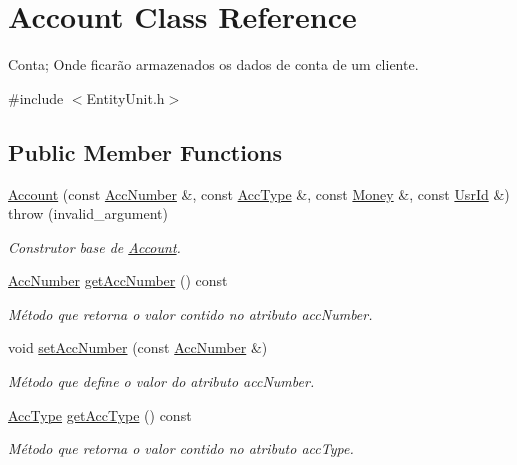 \hypertarget{classAccount}{\section{Account Class Reference}
\label{d7/d10/classAccount}
}


Conta; Onde ficarão armazenados os dados de conta de um cliente.  




{\ttfamily \#include $<$Entity\-Unit.\-h$>$}

\subsection*{Public Member Functions}
\begin{DoxyCompactItemize}
\item 
\hyperlink{classAccount_a26dcd22e552626c14728150a671608a1}{Account} (const \hyperlink{classAccNumber}{Acc\-Number} \&, const \hyperlink{classUsrType}{Acc\-Type} \&, const \hyperlink{classMoney}{Money} \&, const \hyperlink{classUsrId}{Usr\-Id} \&)  throw (invalid\-\_\-argument)
\begin{DoxyCompactList}\small\item\em Construtor base de \hyperlink{classAccount}{Account}. \end{DoxyCompactList}\item 
\hyperlink{classAccNumber}{Acc\-Number} \hyperlink{classAccount_a74f26f24e13e66a055bb8441dfb3d881}{get\-Acc\-Number} () const 
\begin{DoxyCompactList}\small\item\em Método que retorna o valor contido no atributo acc\-Number. \end{DoxyCompactList}\item 
void \hyperlink{classAccount_a3e669090168f13d2a8269af456546a1e}{set\-Acc\-Number} (const \hyperlink{classAccNumber}{Acc\-Number} \&)
\begin{DoxyCompactList}\small\item\em Método que define o valor do atributo acc\-Number. \end{DoxyCompactList}\item 
\hyperlink{classUsrType}{Acc\-Type} \hyperlink{classAccount_a34e1f7e507d7abdf575e4833d6f8d36b}{get\-Acc\-Type} () const 
\begin{DoxyCompactList}\small\item\em Método que retorna o valor contido no atributo acc\-Type. \end{DoxyCompactList}\item 

\end{DoxyCompactItemize}
